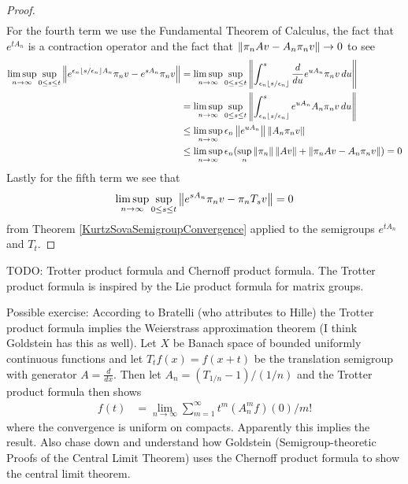 \begin{proof}
\begin{align*}
\end{align*}
For the fourth term we use the Fundamental Theorem of Calculus, the fact that $e^{tA_n}$ is a contraction operator and the fact that $\left \lVert \pi_n A v - A_n \pi_n v \right \rVert \to 0$ to see
\begin{align*}
\limsup_{n \to \infty} \sup_{0 \leq s \leq t} \left \lVert e^{\epsilon_n \left \lfloor s/\epsilon_n \right \rfloor A_n} \pi_n v - e^{s A_n} \pi_n v \right \rVert 
&=\limsup_{n \to \infty} \sup_{0 \leq s \leq t} \left \lVert \int^s_{\epsilon_n \left \lfloor s/\epsilon_n \right \rfloor} \frac{d}{du} e^{uA_n} \pi_n v \, du \right \rVert \\
&=\limsup_{n \to \infty} \sup_{0 \leq s \leq t} \left \lVert \int^s_{\epsilon_n \left \lfloor s/\epsilon_n \right \rfloor} e^{uA_n} A_n \pi_n v \, du \right \rVert \\
&\leq \limsup_{n \to \infty} \epsilon_n \left \lVert e^{uA_n} \right \rVert \left \lVert  A_n \pi_n v  \right \rVert\\
&\leq \limsup_{n \to \infty} \epsilon_n (\sup_n \left \lVert \pi_n \right \rVert \left \lVert Av \right \rVert +  \left \lVert \pi_n A v - A_n \pi_n v  \right \rVert) = 0\\
\end{align*}
Lastly for the fifth term we see that 
\begin{align*}
\limsup_{n \to \infty} \sup_{0 \leq s \leq t} \left \lVert e^{s A_n} \pi_n v - \pi_n T_s v \right \rVert = 0
\end{align*}
from Theorem \ref{KurtzSovaSemigroupConvergence} applied to the semigroups $e^{t A_n}$ and $T_t$.
\end{proof}

TODO: Trotter product formula and Chernoff product formula.  The Trotter product formula is inspired by the Lie product formula for matrix groups.

Possible exercise: According to Bratelli (who attributes to Hille) the Trotter product formula implies the Weierstrass approximation theorem (I think Goldstein has this as well).  Let $X$ be Banach space of bounded uniformly continuous functions and let $T_tf(x) = f(x+t)$ be the translation semigroup with generator $A=\frac{d}{dx}$.  Then let $A_n = (T_{1/n} -1)/(1/n)$ and the Trotter product formula then shows 
\begin{align*}
f(t) &= \lim_{n \to \infty} \sum_{m=1}^\infty t^m (A^m_n f)(0)/m!
\end{align*} 
where the convergence is uniform on compacts.  Apparently this implies
the result.  Also chase down and understand how Goldstein (Semigroup-theoretic Proofs of the Central Limit Theorem) uses the Chernoff product formula to show the central limit theorem.